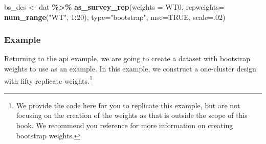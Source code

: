 \documentclass[
]{krantz}
\makeatletter
\newenvironment{Shaded}{\begin{snugshade}}{\end{snugshade}}
\newcommand{\AttributeTok}[1]{\textcolor[rgb]{0.27,0.27,0.27}{#1}}
\newcommand{\ConstantTok}[1]{\textcolor[rgb]{0.37,0.37,0.37}{#1}}
\newcommand{\DecValTok}[1]{\textcolor[rgb]{0.06,0.06,0.06}{#1}}
\newcommand{\FunctionTok}[1]{\textcolor[rgb]{0.27,0.27,0.27}{\textbf{#1}}}
\newcommand{\NormalTok}[1]{#1}
\newcommand{\OtherTok}[1]{\textcolor[rgb]{0.37,0.37,0.37}{#1}}
\newcommand{\SpecialCharTok}[1]{\textcolor[rgb]{0.43,0.43,0.43}{\textbf{#1}}}
\newcommand{\StringTok}[1]{\textcolor[rgb]{0.5,0.5,0.5}{#1}}
\newenvironment{kframe}{%
\medskip{}
\setlength{\fboxsep}{.8em}
 \def\at@end@of@kframe{}%
 \ifinner\ifhmode%
  \def\at@end@of@kframe{\end{minipage}}%
  \begin{minipage}{\columnwidth}%
 \fi\fi%
 \def\FrameCommand##1{\hskip\@totalleftmargin \hskip-\fboxsep
 \colorbox{shadecolor}{##1}\hskip-\fboxsep
     \hskip-\linewidth \hskip-\@totalleftmargin \hskip\columnwidth}%
 \MakeFramed {\advance\hsize-\width
   \@totalleftmargin\z@ \linewidth\hsize
   \@setminipage}}%
 {\par\unskip\endMakeFramed%
 \at@end@of@kframe}
\renewenvironment{Shaded}{\begin{kframe}}{\end{kframe}}
\makeatother
\begin{document}
\begin{Shaded}
\begin{Highlighting}[]
\NormalTok{bs\_des }\OtherTok{\textless{}{-}}\NormalTok{ dat }\SpecialCharTok{\%\textgreater{}\%}
 \FunctionTok{as\_survey\_rep}\NormalTok{(}\AttributeTok{weights =}\NormalTok{ WT0, }
               \AttributeTok{repweights=} \FunctionTok{num\_range}\NormalTok{(}\StringTok{"WT"}\NormalTok{, }\DecValTok{1}\SpecialCharTok{:}\DecValTok{20}\NormalTok{),}
               \AttributeTok{type=}\StringTok{"bootstrap"}\NormalTok{, }
               \AttributeTok{mse=}\ConstantTok{TRUE}\NormalTok{, }
               \AttributeTok{scale=}\NormalTok{.}\DecValTok{02}\NormalTok{)}
\end{Highlighting}
\end{Shaded}

\hypertarget{example-10}{%
\subsubsection*{Example}\label{example-10}}


Returning to the api example, we are going to create a dataset with bootstrap weights to use as an example. In this example, we construct a one-cluster design with fifty replicate weights.\footnote{We provide the code here for you to replicate this example, but are not focusing on the creation of the weights as that is outside the scope of this book. We recommend you reference \citet{wolter2007introduction} for more information on creating bootstrap weights.}
\end{document}
